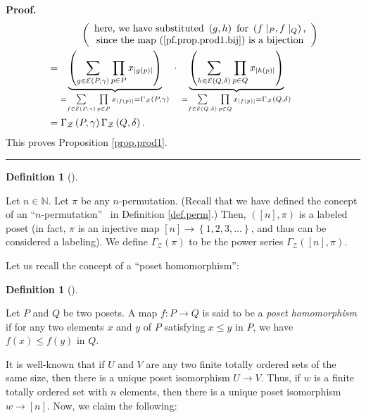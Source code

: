 \documentclass[numbers=enddot,12pt,final,onecolumn,notitlepage]{scrartcl}%
\theoremstyle{definition}
\newtheorem{defi}[theo]{Definition}
\newenvironment{definition}[1][]
{\begin{defi}[#1]\begin{leftbar}}
{\end{leftbar}\end{defi}}
\newenvironment{proof}[1][Proof]{\noindent\textbf{#1.} }{\ \rule{0.5em}{0.5em}}
\let\sumnonlimits\sum
\let\prodnonlimits\prod
\renewcommand{\sum}{\sumnonlimits\limits}
\renewcommand{\prod}{\prodnonlimits\limits}
\begin{document}
\begin{proof}
\begin{align*}
&  \ \ \ \ \ \ \ \ \ \ \left(
\begin{array}
[c]{c}%
\text{here, we have substituted }\left(  g,h\right)  \text{ for }\left(
f\mid_{P},f\mid_{Q}\right)  \text{,}\\
\text{since the map (\ref{pf.prop.prod1.bij}) is a bijection}%
\end{array}
\right) \\
&  =\underbrace{\left(  \sum_{g\in\mathcal{E}\left(  P,\gamma\right)  }%
\prod_{p\in P}x_{\left\vert g\left(  p\right)  \right\vert }\right)
}_{= \sum_{f\in\mathcal{E}\left(  P,\gamma\right)  }%
\prod_{p\in P}x_{\left\vert f\left(  p\right)  \right\vert }
= \Gamma_{\mathcal{Z}}\left(  P,\gamma\right)  }
\ \cdot \ \underbrace{\left(
\sum_{h\in\mathcal{E}\left(  Q,\delta\right)  }\prod_{p\in Q}x_{\left\vert
h\left(  p\right)  \right\vert }\right)  }_{
= \sum_{f\in\mathcal{E}\left(  Q,\delta\right)  }\prod_{p\in Q}x_{\left\vert
f\left(  p\right)  \right\vert }
= \Gamma_{\mathcal{Z}}\left( Q,\delta\right)  }\\
&  =\Gamma_{\mathcal{Z}}\left(  P,\gamma\right)  \Gamma_{\mathcal{Z}}\left(
Q,\delta\right)  .
\end{align*}
This proves Proposition \ref{prop.prod1}.
\end{proof}

\begin{definition}
Let $n\in\mathbb{N}$. Let $\pi$ be any $n$-permutation. (Recall that we have
defined the concept of an \textquotedblleft$n$-permutation\textquotedblright%
\ in Definition \ref{def.perm}.) Then, $\left(  \left[  n\right]  ,\pi\right)
$ is a labeled poset (in fact, $\pi$ is an injective map $\left[  n\right]
\rightarrow\left\{  1,2,3,\ldots\right\}  $, and thus can be considered a
labeling). We define $\Gamma_{\mathcal{Z}}\left(  \pi\right)  $ to be the
power series $\Gamma_{\mathcal{Z}}\left(  \left[  n\right]  ,\pi\right)  $.
\end{definition}

Let us recall the concept of a ``poset homomorphism'':

\begin{definition}
Let $P$ and $Q$ be two posets.
A map $f : P \to Q$ is said to be a \textit{poset homomorphism} if
for any two elements $x$ and $y$ of $P$ satisfying $x \leq y$ in $P$,
we have $f\left(x\right) \leq f\left(y\right)$ in $Q$.
\end{definition}

It is well-known that if $U$ and $V$ are any two finite totally ordered sets
of the same size, then there is a unique poset isomorphism $U \to V$.
Thus, if $w$ is a finite totally ordered set with $n$ elements, then there
is a unique poset isomorphism $w \to \left[ n \right]$.
Now, we claim the following:
\end{document}
